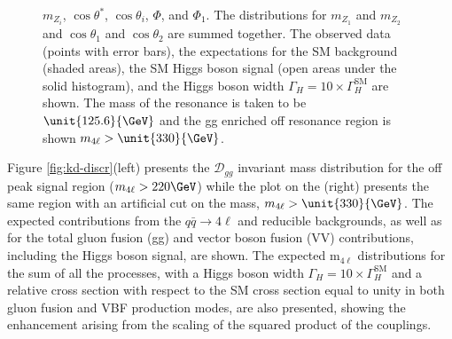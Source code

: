 \begin{figure}
{$m_{Z_i}$, $\cos\theta^*$, $\cos\theta_{i}$, $\Phi$, and $\Phi_{1}$. The distributions for $m_{Z_{1}}$ and $m_{Z_{2}}$ and $\cos\theta_{1}$ and $\cos\theta_{2}$ are summed together. The observed data (points with error bars), the expectations for the SM background (shaded areas),
the SM Higgs boson signal (open areas under the solid histogram), and the Higgs boson width $\Gamma_{H} = 10 \times \Gamma_{H}^{\mathrm{SM}}$ are shown. The mass of the resonance is taken to be $\unit{125.6}{\GeV}$ and the gg enriched off resonance region is shown $m_{4\ell} > \unit{330}{\GeV}$\cite{Khachatryan:2014iha}.}
\label{fig:Width_KD_inputs}
\end{figure}

Figure \ref{fig:kd-discr}(left) presents the $\mathcal{D}_{gg}$ invariant mass distribution
for the off peak signal region ($m_{4\ell} > 220\GeV$) while the plot on the (right) presents the same region with an artificial cut on the mass, $m_{4\ell} > \unit{330}{\GeV}$.
The expected contributions from the $q\bar{q} \to 4\ell$ and reducible backgrounds,
as well as for the total gluon fusion (gg) and vector boson fusion (VV) contributions, including the
Higgs boson signal, are shown. The expected m$_{4\ell}$ distributions for the sum of all the
processes, with a Higgs boson width $\Gamma_{H} = 10 \times \Gamma_{H}^{\mathrm{SM}}$ and a relative
cross section with respect to the SM cross section equal to unity in both gluon fusion and VBF production
modes, are also presented, showing the enhancement arising from the scaling of the squared product of the couplings. 

